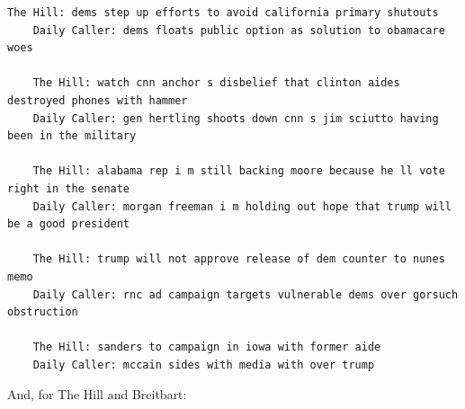 \documentclass{scrartcl}
\begin{document}
\begin{lstlisting}[basicstyle=\tiny\hlfont]
    The Hill: dems step up efforts to avoid california primary shutouts
    Daily Caller: dems floats public option as solution to obamacare woes

    The Hill: watch cnn anchor s disbelief that clinton aides destroyed phones with hammer
    Daily Caller: gen hertling shoots down cnn s jim sciutto having been in the military

    The Hill: alabama rep i m still backing moore because he ll vote right in the senate
    Daily Caller: morgan freeman i m holding out hope that trump will be a good president

    The Hill: trump will not approve release of dem counter to nunes memo
    Daily Caller: rnc ad campaign targets vulnerable dems over gorsuch obstruction

    The Hill: sanders to campaign in iowa with former aide
    Daily Caller: mccain sides with media with over trump
\end{lstlisting}

And, for The Hill and Breitbart:
\end{document}
